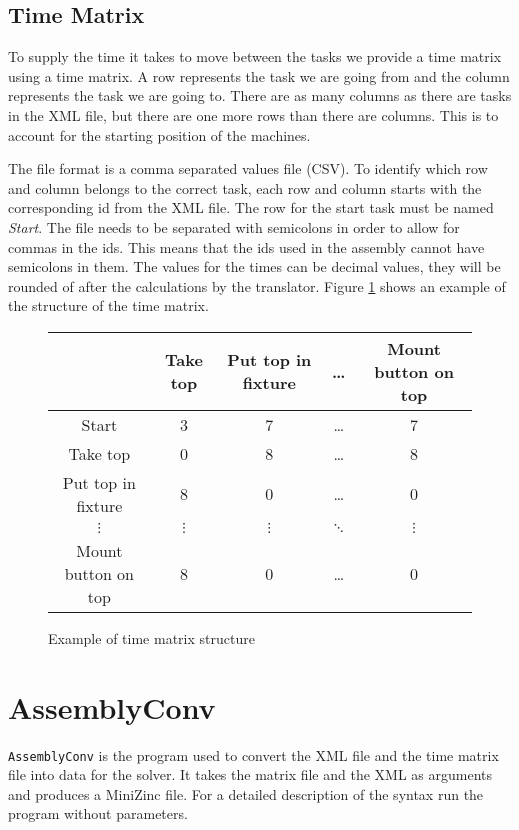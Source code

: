 \subsection{Time Matrix}\label{sec:time_matrix}
To supply the time it takes to move between the tasks we provide a time matrix using a time matrix. A row represents the task we are going from and the column represents the task we are going to. There are as many columns as there are tasks in the XML file, but there are one more rows than there are columns. This is to account for the starting position of the machines.

The file format is a comma separated values file (CSV). To identify which row and column belongs to the correct task, each row and column starts with the corresponding id from the XML file. The row for the start task must be named \emph{Start}. The file needs to be separated with semicolons in order to allow for commas in the ids. This means that the ids used in the assembly cannot have semicolons in them. The values for the times can be decimal values, they will be rounded of after the calculations by the translator. Figure \ref{fig:time_matrix} shows an example of the structure of the time matrix.

\begin{figure}[h]
\begin{tabular}{c|c|c|c|c}
& Take top & Put top in fixture & \dots & Mount button on top\\\hline
Start & 3 & 7 & \dots & 7\\\hline
Take top & 0 & 8 & \dots & 8\\\hline
Put top in fixture & 8 & 0 & \dots & 0\\\hline
$\vdots$ & $\vdots$ & $\vdots$ & $\ddots$ & $\vdots$\\\hline
Mount button on top & 8 & 0 & \dots & 0
\end{tabular}
\caption{Example of time matrix structure}
\label{fig:time_matrix}
\end{figure}

\section{AssemblyConv}\label{sec:assemblyConv}
\texttt{AssemblyConv} is the program used to convert the XML file and the time matrix file into data for the solver. It takes the matrix file and the XML as arguments and produces a MiniZinc file. For a detailed description of the syntax run the program without parameters.

